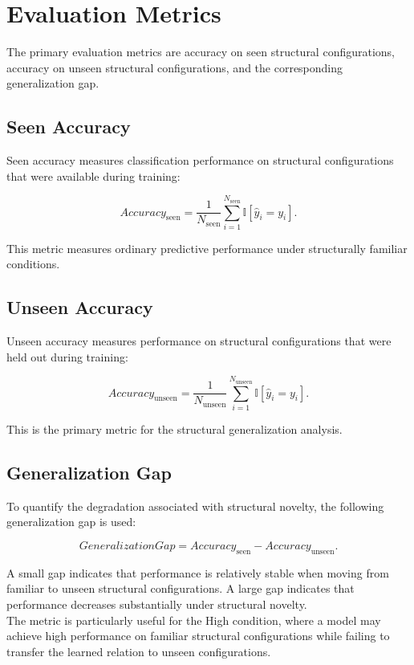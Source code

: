 \section{Evaluation Metrics}

\noindent
The primary evaluation metrics are accuracy on seen structural configurations, accuracy on unseen structural configurations, and the corresponding generalization gap.

\subsection{Seen Accuracy}

\noindent
Seen accuracy measures classification performance on structural configurations that were available during training:

$$
Accuracy_{\mathrm{seen}}
=
\frac{1}{N_{\mathrm{seen}}}
\sum_{i=1}^{N_{\mathrm{seen}}}
\mathbb{I}[\hat{y}_i=y_i].
$$

\noindent
This metric measures ordinary predictive performance under structurally familiar conditions.

\subsection{Unseen Accuracy}

\noindent
Unseen accuracy measures performance on structural configurations that were held out during training:

$$
Accuracy_{\mathrm{unseen}}
=
\frac{1}{N_{\mathrm{unseen}}}
\sum_{i=1}^{N_{\mathrm{unseen}}}
\mathbb{I}[\hat{y}_i=y_i].
$$

\noindent
This is the primary metric for the structural generalization analysis.

\subsection{Generalization Gap}

\noindent
To quantify the degradation associated with structural novelty, the following generalization gap is used:

$$
GeneralizationGap
=
Accuracy_{\mathrm{seen}}
-
Accuracy_{\mathrm{unseen}}.
$$

\noindent
A small gap indicates that performance is relatively stable when moving from familiar to unseen structural configurations. A large gap indicates that performance decreases substantially under structural novelty.
\\
The metric is particularly useful for the High condition, where a model may achieve high performance on familiar structural configurations while failing to transfer the learned relation to unseen configurations.


